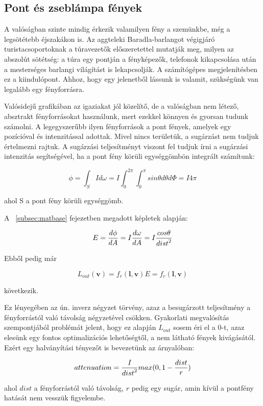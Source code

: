 \subsection{Pont és zseblámpa fények}

A valóságban szinte mindig érkezik valamilyen fény a szemünkbe, még a legsötétebb éjszakákon is. Az aggteleki Baradla-barlangot végigjáró turistacsoportoknak a túravezetők előszeretettel mutatják meg, milyen az abszolút sötétség: a túra egy pontján a fényképezők, telefonok kikapcsolása után a mesterséges barlangi világítást is lekapcsolják. A számítógépes megjelenítésben ez a kiindulópont. Ahhoz, hogy egy jelenetből lássunk is valamit, szükségünk van legalább egy fényforrásra.

Valósidejű grafikában az igaziakat jól közelítő, de a valóságban nem létező, absztrakt fényforrásokat használunk, mert ezekkel könnyen és gyorsan tudunk számolni. A legegyszerűbb ilyen fényforrások a pont fények, amelyek egy pozícióval és intenzitással adottak. Mivel nincs területük, a sugárzást nem tudjuk értelmezni rajtuk. A sugárzási teljesítményt viszont fel tudjuk írni a sugárzási intenzitás segítségével, ha a pont fény körüli egységgömbön integrált számítunk:

\[
\phi = \int_S { I d\omega } = I \int_0^{2\pi} { \int_0^\pi { sin\theta d\theta d\Phi } } = I 4\pi
\]

ahol S a pont fény körüli egységgömb.

A ~\ref{subsec:matbase} fejezetben megadott képletek alapján:

\[
E = { { d\phi } \over { dA } } = I { { d\omega } \over { dA } } = I { { cos\theta } \over { dist }^2 }
\]

Ebből pedig már

\[
L_{out}(\mathbf{v}) = f_r(\mathbf{l}, \mathbf{v}) E = f_r(\mathbf{l}, \mathbf{v}) {}
\]

következik.

Ez lényegében az ún. inverz négyzet törvény, azaz a besugárzott teljesítmény a fényforrástól való távolság négyzetével csökken. Gyakorlati megvalósítás szempontjából problémát jelent, hogy ez alapján \(L_{out}\) sosem éri el a 0-t, azaz elesünk egy fontos optimalizációs lehetőségtől, a nem látható fények kivágásától. Ezért egy halványítási tényezőt is bevezetünk az árnyalóban:

\[
attenuation = { I \over {dist}^2 } max(0, 1 - { dist \over r })
\]

ahol \(dist\) a fényforrástól való távolság, \(r\) pedig egy sugár, amin kívül a pontfény hatását nem vesszük figyelembe.

